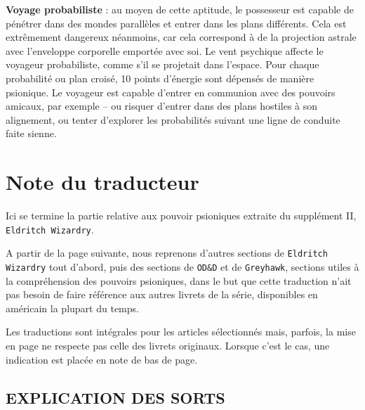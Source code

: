{\bigskip

\textbf{Voyage probabiliste} : au moyen de cette aptitude, le possesseur est capable de pénétrer dans des mondes parallèles et entrer dans les plans différents. Cela est extrêmement dangereux néanmoins, car cela correspond à de la projection astrale avec l'enveloppe corporelle emportée avec soi. Le vent psychique affecte le voyageur probabiliste, comme s'il se projetait dans l'espace. Pour chaque probabilité ou plan croisé, 10 points d'énergie sont dépensés de manière psionique. Le voyageur est capable d'entrer en communion avec des pouvoirs amicaux, par exemple -- ou risquer d'entrer dans des plans hostiles à son alignement, ou tenter d'explorer les probabilités suivant une ligne de conduite faite sienne.

\newpage

\section*{Note du traducteur}

Ici se termine la partie relative aux pouvoir psioniques extraite du supplément II, \texttt{Eldritch Wizardry}.

\bigskip

A partir de la page suivante, nous reprenons d'autres sections de \texttt{Eldritch Wizardry} tout d'abord, puis des sections de \texttt{OD\&D} et de \texttt{Greyhawk}, sections utiles à la compréhension des pouvoirs psioniques, dans le but que cette traduction n'ait pas besoin de faire référence aux autres livrets de la série, disponibles en américain la plupart du temps.

\bigskip

Les traductions sont intégrales pour les articles sélectionnés mais, parfois, la mise en page ne respecte pas celle des livrets originaux. Lorsque c'est le cas, une indication est placée en note de bas de page.

\newpage
\subsection*{\normalsize EXPLICATION DES SORTS}

}
